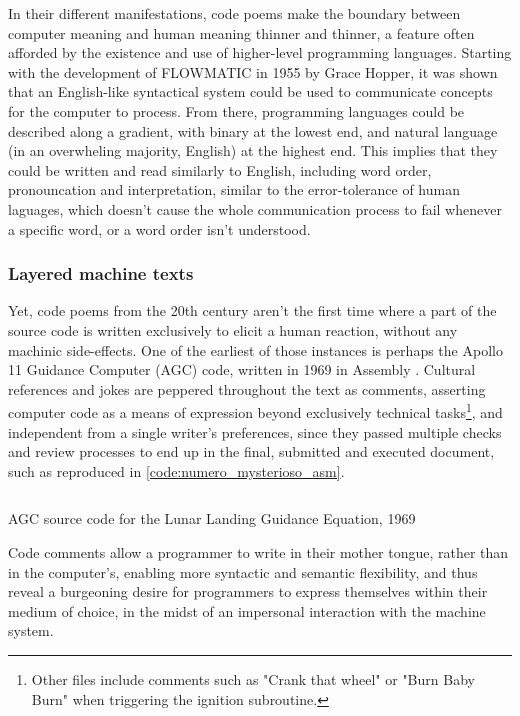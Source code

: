 In their different manifestations, code poems make the boundary between computer meaning and human meaning thinner and thinner, a feature often afforded by the existence and use of higher-level programming languages. Starting with the development of FLOWMATIC in 1955 by Grace Hopper, it was shown that an English-like syntactical system could be used to communicate concepts for the computer to process. From there, programming languages could be described along a gradient, with binary at the lowest end, and natural language (in an overwheling majority, English) at the highest end. This implies that they could be written and read similarly to English, including word order, pronouncation and interpretation, similar to the error-tolerance of human laguages, which doesn't cause the whole communication process to fail whenever a specific word, or a word order isn't understood.

\subsubsection{Layered machine texts}
\label{subsubsec:layered-machine-texts}

Yet, code poems from the 20th century aren't the first time where a part of the source code is written exclusively to elicit a human reaction, without any machinic side-effects. One of the earliest of those instances is perhaps the Apollo 11 Guidance Computer (AGC) code, written in 1969 in Assembly \citep{garry_lunar_1969}. Cultural references and jokes are peppered throughout the text as comments, asserting computer code as a means of expression beyond exclusively technical tasks\footnote{Other files include comments such as "Crank that wheel" or "Burn Baby Burn" when triggering the ignition subroutine.}, and independent from a single writer's preferences, since they passed multiple checks and review processes to end up in the final, submitted and executed document, such as reproduced in \autoref{code:numero_mysterioso_asm}.

\begin{listing}
  \inputminted{ca65}{./corpus/numero_mysterioso.asm}
  \caption{AGC source code for the Lunar Landing Guidance Equation, 1969}
  \label{code:numero_mysterioso_asm}
\end{listing}

Code comments allow a programmer to write in their mother tongue, rather than in the computer's, enabling more syntactic and semantic flexibility, and thus reveal a burgeoning desire for programmers to express themselves within their medium of choice, in the midst of an impersonal interaction with the machine system.

